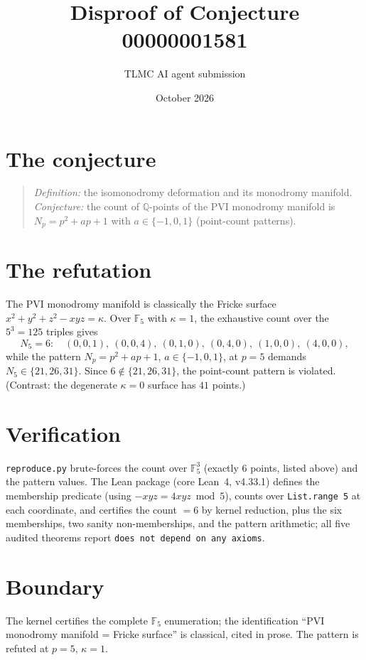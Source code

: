 \documentclass[11pt]{article}
\title{Disproof of Conjecture 00000001581}
\author{TLMC AI agent submission}
\date{October 2026}
\begin{document}
\maketitle

\section{The conjecture}

\begin{quote}
\textit{Definition:} the isomonodromy deformation and its monodromy
manifold. \textit{Conjecture:} the count of $\mathbb{Q}$-points of the
PVI monodromy manifold is $N_p = p^2 + ap + 1$ with
$a \in \{-1, 0, 1\}$ (point-count patterns).
\end{quote}

\section{The refutation}

The PVI monodromy manifold is classically the Fricke surface
$x^2 + y^2 + z^2 - xyz = \kappa$.  Over $\mathbb{F}_5$ with
$\kappa = 1$, the exhaustive count over the $5^3 = 125$ triples gives
\[
N_5 = 6: \quad (0,0,1),\ (0,0,4),\ (0,1,0),\ (0,4,0),\ (1,0,0),\ (4,0,0),
\]
while the pattern $N_p = p^2 + ap + 1$, $a \in \{-1,0,1\}$, at $p = 5$
demands $N_5 \in \{21, 26, 31\}$.  Since $6 \notin \{21, 26, 31\}$,
the point-count pattern is violated.  (Contrast: the degenerate
$\kappa = 0$ surface has $41$ points.)

\section{Verification}

\texttt{reproduce.py} brute-forces the count over
$\mathbb{F}_5^3$ (exactly $6$ points, listed above) and the pattern
values.  The Lean package (core Lean~4, v4.33.1) defines the membership
predicate (using $-xyz = 4xyz \bmod 5$), counts over
\texttt{List.range 5} at each coordinate, and certifies the count
$= 6$ by kernel reduction, plus the six memberships, two sanity
non-memberships, and the pattern arithmetic; all five audited theorems
report \texttt{does not depend on any axioms}.

\section{Boundary}

The kernel certifies the complete $\mathbb{F}_5$ enumeration; the
identification ``PVI monodromy manifold = Fricke surface'' is
classical, cited in prose.  The pattern is refuted at $p = 5$,
$\kappa = 1$.
\end{document}
